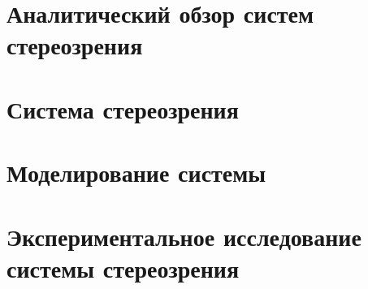 \documentclass[a4paper,14pt]{extarticle} %
\begin{document}



\setcounter{page}{0}
\tableofcontents %
\thispagestyle{empty}
\clearpage
\setcounter{page}{6} %


\section{Аналитический обзор систем стереозрения}
      

\newpage
\section{Система стереозрения}

\newpage
\section{Моделирование системы}





\newpage
\section{Экспериментальное исследование системы стереозрения}
 
\vspace{\baselineskip}

\vspace{\baselineskip}

\end{document}
